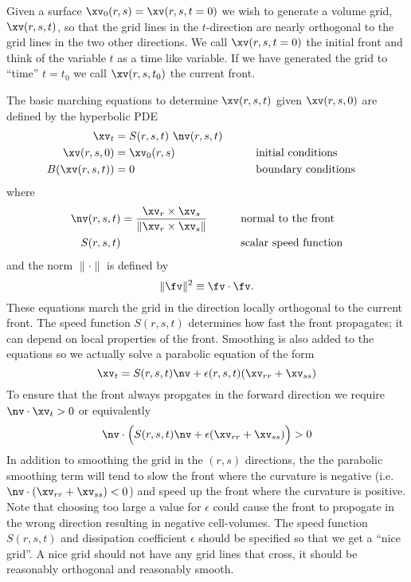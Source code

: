 Given a surface $\xv_0(r,s)=\xv(r,s,t=0)$ we wish to generate a volume
grid, $\xv(r,s,t)$, so that the grid lines in the $t$-direction are
nearly orthogonal to the grid lines in the two other directions.  We
call $\xv(r,s,t=0)$ the initial front and think of the variable $t$ as
a time like variable.  If we have generated the grid to ``time''
$t=t_0$ we call $\xv(r,s,t_0)$ the current front.


The basic marching equations to determine $\xv(r,s,t)$ given $\xv(r,s,0)$ are defined by
the hyperbolic PDE
\begin{alignat*}{3}
   \xv_t &= S(r,s,t)~ \nv(r,s,t) \\
   \xv(r,s,0) &= \xv_0(r,s) &&\qquad \mbox{initial conditions} \\
   B(\xv(r,s,t))&=0 && \qquad \mbox{boundary conditions}
\end{alignat*}
where
\begin{alignat*}{3}
  \nv(r,s,t) &= {\xv_r \times \xv_s \over \| \xv_r \times \xv_s \|} &&\qquad\mbox{normal to the front} \\
  S(r,s,t) & &&\qquad\mbox{scalar speed function}  
\end{alignat*}
and the norm $\| \cdot \|$ is defined by
\[
  \| \fv \|^2  \equiv \fv \cdot \fv.
\]
These equations march the grid in the direction locally orthogonal to the current front. 
The speed function $S(r,s,t)$ determines how fast the front propagates; it can depend
on local properties of the front. 
Smoothing is also added to the equations so we actually solve a parabolic equation of the form
\[
    \xv_t = S(r,s,t) \nv  + \epsilon(r,s,t) ( \xv_{rr} + \xv_{ss} )
\]
To ensure that the front always propgates in the forward direction we require
$\nv\cdot\xv_t > 0$ or equivalently
\[
   \nv\cdot\Big( S(r,s,t) \nv  + \epsilon( \xv_{rr} + \xv_{ss}) \Big) > 0 
\]
In addition to smoothing the grid in the $(r,s)$ directions, the the
parabolic smoothing term will tend to slow the front where the
curvature is negative (i.e. $\nv\cdot(\xv_{rr}+\xv_{ss}) < 0$) and speed up the front where the curvature is
positive. Note that choosing too large a value for $\epsilon$ could cause the
front to propogate in the wrong direction resulting in negative
cell-volumes.  The speed function $S(r,s,t)$ and dissipation
coefficient $\epsilon$ should be specified so that we get a ``nice
grid''. A nice grid should not have any grid lines that cross, it should be reasonably orthogonal
and reasonably smooth. 


